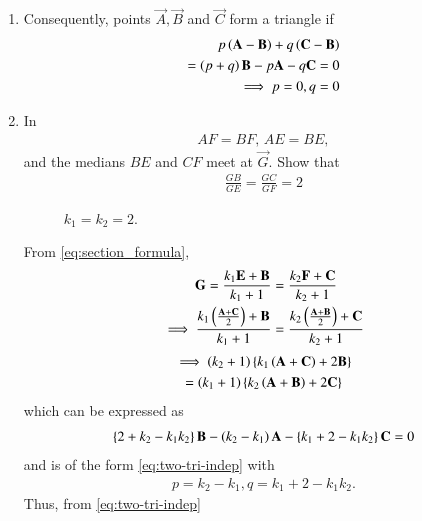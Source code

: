 \begin{enumerate}[label=\thesection.\arabic*.,ref=\thesection.\theenumi]
  \item Consequently, points $\vec{A},\vec{B}$ and $\vec{C}$ form a triangle  if 
	  \label{prop:two-tri-indep}
  \begin{align}
	  p\left(\mathbf{A}- \mathbf{B}\right) +q\left(\mathbf{C} -\mathbf{B}\right) 
	  \\
	  =\left(p+q\right)\mathbf{B}- p\mathbf{A} -q\mathbf{C} = 0
	  \\
	  \implies p=0, q=0
	  \label{eq:two-tri-indep}
  \end{align}
  \item In 
	\begin{align}
	AF = BF, \,
	AE = BE, 
	\end{align}
	and the medians $BE$ and $CF$ meet at $\vec{G}$.
	Show that 
	\begin{align}
\label{eq:tri_med_centroid_ratio}
	\frac{GB}{GE} = \frac{GC}{GF} = 2
	\end{align}
%
\begin{figure}[!ht]
	\begin{center}
		\resizebox{\columnwidth}{!}{}
	\end{center}
	\caption{$k_1=k_2=2$.}
	\label{fig:tri_med_isect}	
\end{figure}
\solution From 
	  \eqref{eq:section_formula},
  \begin{align}
	  \label{eq:section_formula-G}
\mathbf{G} = 
	   \frac{k_1\mathbf{E}+ \mathbf{B}}{k_1+1}
	  &= \frac{k_2\mathbf{F}+ \mathbf{C}}{k_2+1}
	  \\
	  \implies 
	   \frac{k_1\left(\frac{\mathbf{A}+\mathbf{C}}{2}\right)+ \mathbf{B}}{k_1+1}
	  &= \frac{k_2\left(\frac{\mathbf{A}+\mathbf{B}}{2}\right)+ \mathbf{C}}{k_2+1}
  \end{align}
\begin{multline}
	  \implies 
	\left(k_2+1\right)   \left\{k_1\left({\mathbf{A}+\mathbf{C}}\right)+ 2\mathbf{B}\right\}
	  \\= \left(k_1+1\right)\left\{k_2\left({\mathbf{A}+\mathbf{B}}\right)+ 2\mathbf{C}\right\}
\end{multline}
  which can be expressed as
  \begin{align}
	  \left\{2 + k_2- k_1k_2 \right\}\mathbf{B}-\left(k_2-k_1\right)\mathbf{A}  - \left\{k_1 +2 - k_1k_2\right\}\mathbf{C}
	  =0
  \end{align}
  and is of the form
	  \eqref{eq:two-tri-indep}
	  with 
  \begin{align}
	  p = {k_2-k_1}, q = {k_1 +2 - k_1k_2}.
  \end{align}
  Thus, from 
	  \eqref{eq:two-tri-indep}
  \begin{align}

\end{align}
\end{enumerate}
